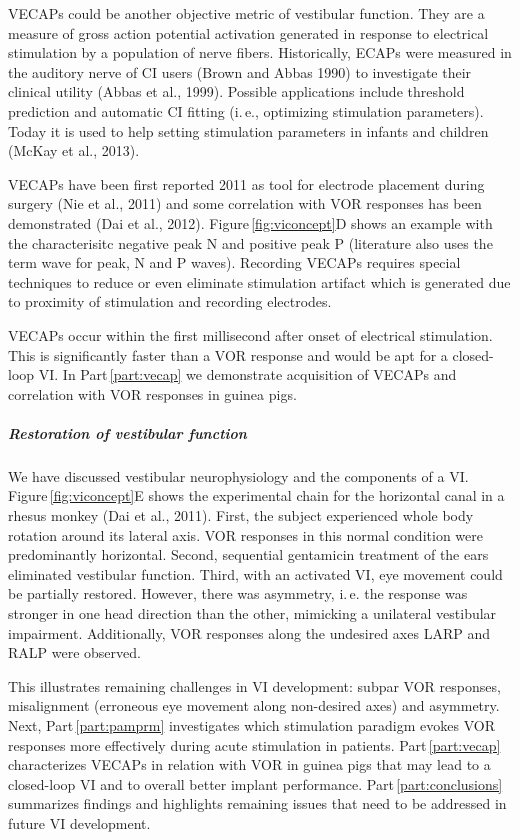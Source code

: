 VECAPs could be another objective metric of vestibular function. They are a measure of gross action potential activation generated in response to electrical stimulation by a population of nerve fibers. Historically, ECAPs were measured in the auditory nerve of CI users (Brown and Abbas 1990) to investigate their clinical utility (Abbas et al., 1999). Possible applications include threshold prediction and automatic CI fitting (i.\,e., optimizing stimulation parameters). Today it is used to help setting stimulation parameters in infants and children (McKay et al., 2013).

VECAPs have been first reported 2011 as tool for electrode placement during surgery (Nie et al., 2011) and some correlation with VOR responses has been demonstrated (Dai et al., 2012). Figure\,\ref{fig:viconcept}D shows an example with the characterisitc negative peak N and positive peak P (literature also uses the term wave for peak, N and P waves). Recording VECAPs requires special techniques to reduce or even eliminate stimulation artifact which is generated due to proximity of stimulation and recording electrodes.

VECAPs occur within the first millisecond after onset of electrical stimulation. This is significantly faster than a VOR response and would be apt for a closed-loop VI. In Part\,\ref{part:vecap} we demonstrate acquisition of VECAPs and correlation with VOR responses in guinea pigs.  

\subparagraph{Restoration of vestibular function}
We have discussed vestibular neurophysiology and the components of a VI. Figure\,\ref{fig:viconcept}E shows the experimental chain for the horizontal canal in a rhesus monkey (Dai et al., 2011). First, the subject experienced whole body rotation around its lateral axis. VOR responses in this normal condition were predominantly horizontal. Second, sequential gentamicin treatment of the ears eliminated vestibular function. Third, with an activated VI, eye movement could be partially restored. However, there was asymmetry, i.\,e. the response was stronger in one head direction than the other, mimicking a unilateral vestibular impairment. Additionally, VOR responses along the undesired axes LARP and RALP were observed.

This illustrates remaining challenges in VI development: subpar VOR responses, misalignment (erroneous eye movement along non-desired axes) and asymmetry. Next, Part\,\ref{part:pamprm} investigates which stimulation paradigm evokes VOR responses more effectively during acute stimulation in patients. Part\,\ref{part:vecap} characterizes VECAPs in relation with VOR in guinea pigs that may lead to a closed-loop VI and to overall better implant performance. Part\,\ref{part:conclusions} summarizes findings and highlights remaining issues that need to be addressed in future VI development.